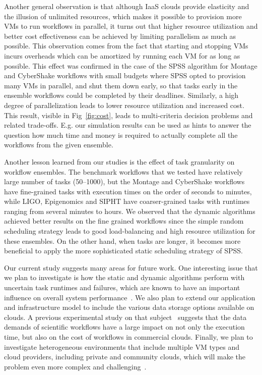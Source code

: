 \documentclass{sig-alternate}
\begin{document}
Another general observation is that although IaaS clouds provide elasticity
and the illusion of unlimited resources, which makes it possible to provision
more VMs to run workflows in parallel, it turns out that higher resource
utilization and better cost effectiveness can be achieved by limiting 
parallelism as much as possible. This observation comes from the fact that 
starting and stopping VMs incurs overheads which can be amortized by running
each VM for as long as possible. This effect was confirmed in the case of 
the SPSS algorithm for Montage and CyberShake workflows with small budgets
where SPSS opted to provision many VMs in parallel, and shut them down early,
so that tasks early in the ensemble workflows could be completed by their 
deadlines. Similarly, a high degree of parallelization leads to lower 
resource utilization and increased cost. This result, visible in 
Fig~\ref{fig:cost}, leads to multi-criteria decision problems and related 
trade-offs. E.g. our simulation results can be used as hints to answer
the question how much time and money is required to actually complete all the
workflows from the given ensemble.

Another lesson learned from our studies is the effect of task granularity on 
workflow ensembles. The benchmark workflows that we tested have relatively 
large number of tasks (50--1000), but the Montage and CyberShake workflows have 
fine-grained tasks with execution times on the order of seconds to minutes, 
while LIGO, Epigenomics and SIPHT have coarser-grained tasks with runtimes 
ranging from several minutes to hours. We observed that the dynamic 
algorithms achieved better results on the fine grained workflows since the 
simple random scheduling strategy leads to good load-balancing and high 
resource utilization for these ensembles. On the other hand, when tasks are
longer, it becomes more beneficial to apply the more sophisticated static 
scheduling strategy of SPSS.

Our current study suggests many areas for future work. One interesting
issue that we plan to investigate is how the static and dynamic algorithms 
perform with uncertain task runtimes and failures, which are known to have 
an important influence on overall system performance~\cite{Sakellariou2010,Dongarra2007}. 
We also plan to extend our application and infrastructure model to 
include the various data storage options available on clouds. A previous 
experimental study on that subject~\cite{Juve2010} suggests that the data 
demands of scientific workflows have a large impact on not only the 
execution time, but also on the cost of workflows in commercial clouds. 
Finally, we plan to investigate heterogeneous environments that include 
multiple VM types and cloud providers, including private and community clouds, 
which will make the problem even more complex and challenging~\cite{Marshall2010,vockler11,Juve2010}.







\end{document}
